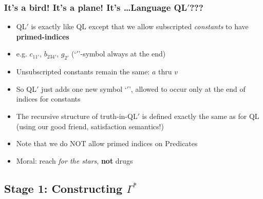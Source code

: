 \begin{frame}
\frametitle{It's a bird! It's a plane! It's \dots Language QL$'$???}

\begin{itemize}[<+->]

\item QL$'$ is exactly like QL except that we allow subscripted \textit{constants} to have \textbf{primed-indices}

\item e.g. $c_{11'}$, $b_{234'}$, $g_{2'}$ (`$\prime$'-symbol always at the end)

\item Unsubscripted constants remain the same: $a$ thru $v$ 

\item So QL$'$ just adds one new symbol `$\prime$', allowed to occur only at the end of indices for constants

\item The recursive structure of truth-in-QL$'$ is defined exactly the same as for QL (using our good friend, satisfaction semantics!)

\item Note that we do NOT allow primed indices on Predicates

\item Moral: reach \textit{for the stars}, \textbf{\textcolor{OGlyallpink}{not}} drugs


\end{itemize}
\end{frame}

\subsection{Stage 1: Constructing $\Gamma^{\ast}$}

